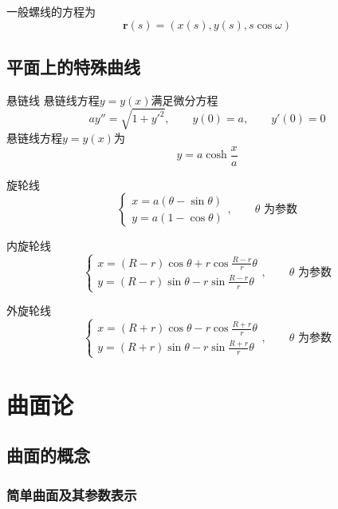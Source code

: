 \documentclass[lang = cn, scheme = chinese, thmcnt = section]{elegantbook}
\newcommand{\bs}{\boldsymbol}          %
\begin{document}
\begin{theorem}
	一般螺线的方程为
	$$
	\bs{r}(s)=(x(s),y(s),s\cos\omega)
	$$
\end{theorem}

\section{平面上的特殊曲线}

\begin{definition}{悬链线}
	悬链线方程$y=y(x)$满足微分方程
	$$
	ay''=\sqrt{1+y'^2},\qquad 
	y(0)=a,\qquad 
	y'(0)=0
	$$
	悬链线方程$y=y(x)$为
	$$
	y=a\cosh\frac{x}{a}
	$$
\end{definition}

\begin{definition}{旋轮线}
	$$
	\begin{cases}
		x=a(\theta-\sin\theta)\\
		y=a(1-\cos\theta)
	\end{cases},\qquad \theta\text{ 为参数}
	$$
\end{definition}

\begin{definition}{内旋轮线}
	$$
	\begin{cases}
		x=(R-r)\cos\theta+r\cos\frac{R-r}{r}\theta\\
		y=(R-r)\sin\theta-r\sin\frac{R-r}{r}\theta
	\end{cases},\qquad \theta\text{ 为参数}
	$$
\end{definition}

\begin{definition}{外旋轮线}
	$$
	\begin{cases}
		x=(R+r)\cos\theta-r\cos\frac{R+r}{r}\theta\\
		y=(R+r)\sin\theta-r\sin\frac{R+r}{r}\theta
	\end{cases},\qquad \theta\text{ 为参数}
	$$
\end{definition}

\chapter{曲面论}

\section{曲面的概念}

\subsection{简单曲面及其参数表示}
\end{document}
